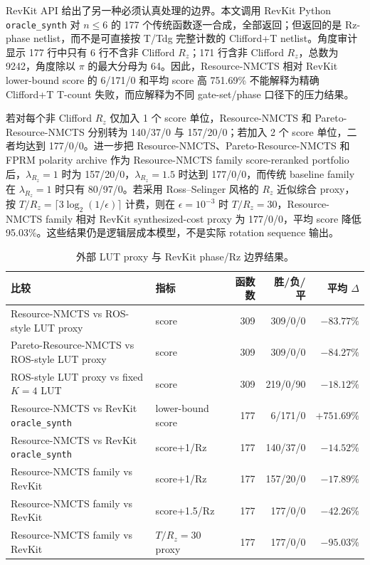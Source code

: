 \documentclass[UTF8,fontset=macnew,11pt]{ctexart}
\newcommand{\method}{Resource-NMCTS}
\begin{document}
RevKit API 给出了另一种必须认真处理的边界。本文调用 RevKit Python \texttt{oracle\_synth} 对 $n\leq6$ 的 177 个传统函数逐一合成，全部返回；但返回的是 Rz-phase netlist，而不是可直接按 T/Tdg 完整计数的 Clifford+T netlist。角度审计显示 177 行中只有 6 行不含非 Clifford $R_z$；171 行含非 Clifford $R_z$，总数为 9242，角度除以 $\pi$ 的最大分母为 64。因此，\method{} 相对 RevKit lower-bound score 的 6/171/0 和平均 score 高 751.69\% 不能解释为精确 Clifford+T T-count 失败，而应解释为不同 gate-set/phase 口径下的压力结果。

若对每个非 Clifford $R_z$ 仅加入 1 个 score 单位，\method{} 和 Pareto-\method{} 分别转为 140/37/0 与 157/20/0；若加入 2 个 score 单位，二者均达到 177/0/0。进一步把 \method{}、Pareto-\method{} 和 FPRM polarity archive 作为 Resource-NMCTS family score-reranked portfolio 后，$\lambda_{R_z}=1$ 时为 157/20/0，$\lambda_{R_z}=1.5$ 时达到 177/0/0，而传统 baseline family 在 $\lambda_{R_z}=1$ 时只有 80/97/0。若采用 Ross--Selinger 风格的 $R_z$ 近似综合 proxy，按 $T/R_z=\lceil3\log_2(1/\epsilon)\rceil$ 计费，则在 $\epsilon=10^{-3}$ 时 $T/R_z=30$，Resource-NMCTS family 相对 RevKit synthesized-cost proxy 为 177/0/0，平均 score 降低 95.03\%。这些结果仍是逻辑层成本模型，不是实际 rotation sequence 输出。

\begin{table}[H]
\centering
\scriptsize
\caption{外部 LUT proxy 与 RevKit phase/Rz 边界结果。}
\label{tab:external-v27}
\begin{tabularx}{\linewidth}{>{\raggedright\arraybackslash}Xlrrr}
\toprule
比较 & 指标 & 函数数 & 胜/负/平 & 平均 $\Delta$ \\
\midrule
\method{} vs ROS-style LUT proxy & score & 309 & 309/0/0 & $-83.77\%$ \\
Pareto-\method{} vs ROS-style LUT proxy & score & 309 & 309/0/0 & $-84.27\%$ \\
ROS-style LUT proxy vs fixed $K=4$ LUT & score & 309 & 219/0/90 & $-18.12\%$ \\
\method{} vs RevKit \texttt{oracle\_synth} & lower-bound score & 177 & 6/171/0 & $+751.69\%$ \\
\method{} vs RevKit \texttt{oracle\_synth} & score+1/Rz & 177 & 140/37/0 & $-14.52\%$ \\
Resource-NMCTS family vs RevKit & score+1/Rz & 177 & 157/20/0 & $-17.89\%$ \\
Resource-NMCTS family vs RevKit & score+1.5/Rz & 177 & 177/0/0 & $-42.26\%$ \\
Resource-NMCTS family vs RevKit & $T/R_z=30$ proxy & 177 & 177/0/0 & $-95.03\%$ \\
\bottomrule
\end{tabularx}
\end{table}
\end{document}
